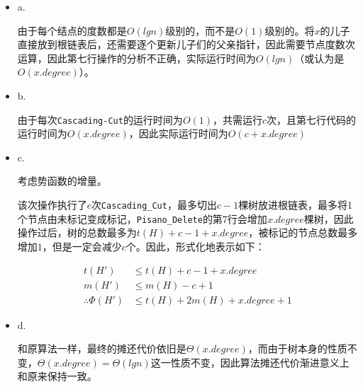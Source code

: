 \documentclass[]{article}
\begin{document}
\begin{itemize}
\item
  a.

  由于每个结点的度数都是\(O(lgn)\)级别的，而不是\(O(1)\)级别的。将\(x\)的儿子直接放到根链表后，还需要逐个更新儿子们的父亲指针，因此需要节点度数次运算，因此第七行操作的分析不正确，实际运行时间为\(O(lgn)\)（或认为是\(O(x.degree)\)）。
\item
  b.

  由于每次\texttt{Cascading-Cut}的运行时间为\(O(1)\)，共需运行\(c\)次，且第七行代码的运行时间为\(O(x.degree)\)，因此实际运行时间为\(O(c+x.degree)\)
\item
  c.

  考虑势函数的增量。

  该次操作执行了\(c\)次\texttt{Cascading\_Cut}，最多切出\(c-1\)棵树放进根链表，最多将1个节点由未标记变成标记，\texttt{Pisano\_Delete}的第7行会增加\(x.degree\)棵树，因此操作过后，树的总数最多为\(t(H)+c-1+x.degree\)，被标记的节点总数最多增加\(1\)，但是一定会减少\(c\)个。因此，形式化地表示如下：

  \[\begin{aligned}
  	t(H') &\leq t(H) + c - 1 + x.degree \\
  	m(H') &\leq m(H) - c + 1 \\
  	\therefore \Phi(H') & \leq t(H)+2m(H)+x.degree+1
  \end{aligned}\]
\item
  d.

  和原算法一样，最终的摊还代价依旧是\(\Theta(x.degree)\)，而由于树本身的性质不变，\(\Theta(x.degree)=\Theta(lgn)\)这一性质不变，因此算法摊还代价渐进意义上和原来保持一致。
\end{itemize}
\end{document}
